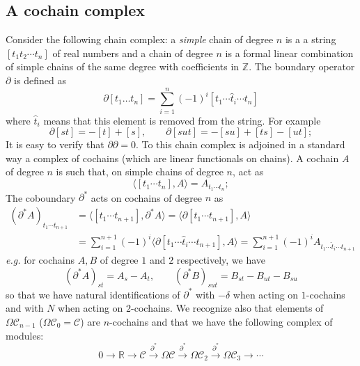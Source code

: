 \documentclass[a4paper,12pt,reqno]{amsproc}
\newcommand{\RR}{\mathbb{R}}
\newcommand{\NN}{N}
\newcommand{\CC}{\mathcal{C}}
\newcommand{\OCC}{\Omega \mathcal{C}}
\begin{document}
\subsection{A cochain complex}
Consider the following chain complex: a \emph{simple} chain of degree $n$ is a
a string 
$[t_1 t_2 \cdots t_n]$ of real numbers and a chain of degree $n$ is
a formal linear combination of simple chains of the same degree with
coefficients in $\mathbb{Z}$. The boundary operator $\partial$ is
defined as
\begin{equation}
  \label{eq:boundary}
 \partial[t_1 \dots t_n] = \sum_{i=1}^n (-1)^{i} [t_1 \cdots \hat t_i \cdots t_n]  
\end{equation}
where $\hat t_i$ means that this element is removed from the
string. For example
\begin{equation*}
  \partial[st] = -[t]+[s], \qquad \partial [sut] = -[su]+[ts]-[ut];
\end{equation*}
It is easy to verify that $\partial \partial = 0$. To this chain
complex is adjoined in a standard way a complex of cochains (which are
linear functionals on chains). A cochain $A$ of degree $n$ is such
that, on simple chains  of degree $n$, act as
\begin{equation*}
 \langle [t_1\cdots t_n],A\rangle = A_{t_1\cdots t_n};
\end{equation*}
The coboundary $\partial^*$ acts on cochains of degree $n$ as
\begin{equation}
  \label{eq:coboundary}
  \begin{split}
(\partial^* A)_{t_1\cdots t_{n+1}} & = \langle[t_1\cdots
t_{n+1}],\partial^* A \rangle = \langle \partial [t_1\cdots
t_{n+1}], A \rangle      
\\ & = \sum_{i=1}^{n+1} (-1)^i
 \langle \partial [t_1\cdots \hat t_i \cdots
t_{n+1}], A \rangle =   \sum_{i=1}^{n+1} (-1)^i A_{t_1\cdots \hat t_i \cdots
t_{n+1}}
  \end{split}
\end{equation}
\emph{e.g.} for cochains $A,B$ of degree $1$ and $2$ respectively, we have
\begin{equation*}
  (\partial^* A)_{st} = A_s - A_t, \qquad (\partial^* B)_{sut} = B_{st}-B_{ut}-B_{su}
\end{equation*}
so that we have natural identifications of $\partial^*$ with $-\delta$ when acting on
$1$-cochains and with $\NN$ when acting on $2$-cochains. We recognize
also that elements of $\OCC_{n-1}$ ($\OCC_0 =
\CC$) are $n$-cochains  and that
we have the following complex of modules:
\begin{equation*}
 0 \rightarrow \RR \rightarrow \CC \stackrel{\partial^*}{\longrightarrow} \OCC \stackrel{\partial^*}{\longrightarrow} \OCC_2 \stackrel{\partial^*}{\longrightarrow} \OCC_3 \rightarrow \cdots 
\end{equation*}
\end{document}
